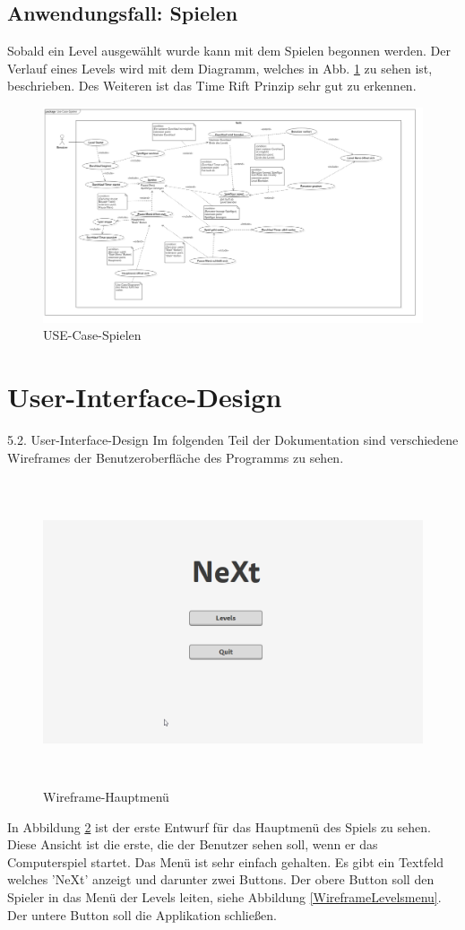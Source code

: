\subsection{Anwendungsfall: Spielen}
Sobald ein Level ausgewählt wurde kann mit dem Spielen begonnen werden. Der Verlauf eines Levels wird mit dem Diagramm, welches in Abb. \ref{USE-Case-Spielen} zu sehen ist, beschrieben. Des Weiteren ist das Time Rift Prinzip sehr gut zu erkennen.
\begin{figure}[H]
	\centering
	\includegraphics[angle=90,scale=0.30]{images/UseCaseSpielen.png}
	\caption{USE-Case-Spielen}
	\label{USE-Case-Spielen}
\end{figure}
\section{User-Interface-Design}
5.2.	User-Interface-Design
Im folgenden Teil der Dokumentation sind verschiedene Wireframes der Benutzeroberfläche des Programms zu sehen.

\begin{figure}[H]
	\centering
	\includegraphics[width=16cm, height=9cm]{images/WireframeMainmenu.png}
	\caption{Wireframe-Hauptmenü}
	\label{WireframeMainmenu}
\end{figure}
In Abbildung \ref{WireframeMainmenu} ist der erste Entwurf für das Hauptmenü des Spiels zu sehen. Diese Ansicht ist die erste, die der Benutzer sehen soll, wenn er das Computerspiel startet. Das Menü ist sehr einfach gehalten. Es gibt ein Textfeld welches ’NeXt’ anzeigt und darunter zwei Buttons. Der obere Button soll den Spieler in das Menü der Levels leiten, siehe Abbildung \ref{WireframeLevelsmenu}. Der untere Button soll die Applikation schließen.


